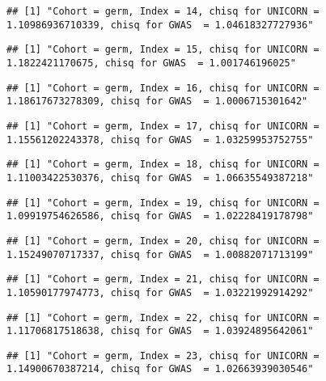 \documentclass[]{article}
\begin{document}
\begin{verbatim}
## [1] "Cohort = germ, Index = 14, chisq for UNICORN = 1.10986936710339, chisq for GWAS  = 1.04618327727936"
\end{verbatim}

\begin{verbatim}
## [1] "Cohort = germ, Index = 15, chisq for UNICORN = 1.1822421170675, chisq for GWAS  = 1.001746196025"
\end{verbatim}

\begin{verbatim}
## [1] "Cohort = germ, Index = 16, chisq for UNICORN = 1.18617673278309, chisq for GWAS  = 1.0006715301642"
\end{verbatim}

\begin{verbatim}
## [1] "Cohort = germ, Index = 17, chisq for UNICORN = 1.15561202243378, chisq for GWAS  = 1.03259953752755"
\end{verbatim}

\begin{verbatim}
## [1] "Cohort = germ, Index = 18, chisq for UNICORN = 1.11003422530376, chisq for GWAS  = 1.06635549387218"
\end{verbatim}

\begin{verbatim}
## [1] "Cohort = germ, Index = 19, chisq for UNICORN = 1.09919754626586, chisq for GWAS  = 1.02228419178798"
\end{verbatim}

\begin{verbatim}
## [1] "Cohort = germ, Index = 20, chisq for UNICORN = 1.15249070717337, chisq for GWAS  = 1.00882071713199"
\end{verbatim}

\begin{verbatim}
## [1] "Cohort = germ, Index = 21, chisq for UNICORN = 1.10590177974773, chisq for GWAS  = 1.03221992914292"
\end{verbatim}

\begin{verbatim}
## [1] "Cohort = germ, Index = 22, chisq for UNICORN = 1.11706817518638, chisq for GWAS  = 1.03924895642061"
\end{verbatim}

\begin{verbatim}
## [1] "Cohort = germ, Index = 23, chisq for UNICORN = 1.14900670387214, chisq for GWAS  = 1.02663939030546"
\end{verbatim}
\end{document}

